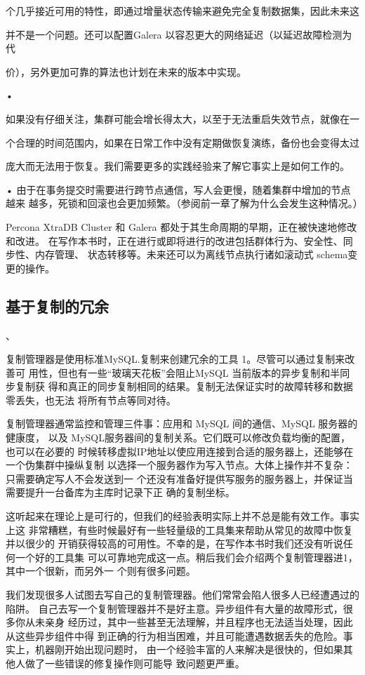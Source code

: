 个几乎接近可用的特性，即通过增量状态传输来避免完全复制数据集，因此未来这

并不是一个问题。还可以配置Galera 以容忍更大的网络延迟（以延迟故障检测为代

价），另外更加可靠的算法也计划在未来的版本中实现。

•

如果没有仔细关注，集群可能会增长得太大，以至于无法重启失效节点，就像在一

个合理的时间范围内，如果在日常工作中没有定期做恢复演练，备份也会变得太过

庞大而无法用于恢复。我们需要更多的实践经验来了解它事实上是如何工作的。

• 由于在事务提交时需要进行跨节点通信，写人会更慢，随着集群中增加的节点越来
越多，死锁和回滚也会更加频繁。（参阅前一章了解为什么会发生这种情况。）

Percona XtraDB Cluster 和 Galera 都处于其生命周期的早期，正在被快速地修改和改进。
在写作本书时，正在进行或即将进行的改进包括群体行为、安全性、同步性、内存管理、
状态转移等。未来还可以为离线节点执行诸如滚动式 schema变更的操作。

\subsection{基于复制的冗余}
、

复制管理器是使用标准MySQL.复制来创建冗余的工具 1。尽管可以通过复制来改善可
用性，但也有一些“玻璃天花板”会阻止MySQL 当前版本的异步复制和半同步复制获
得和真正的同步复制相同的结果。复制无法保证实时的故障转移和数据零丢失，也无法
将所有节点等同对待。

复制管理器通常监控和管理三件事：应用和 MySQL 间的通信、MySQL 服务器的健康度，
以及 MySQL服务器间的复制关系。它们既可以修改负载均衡的配置，也可以在必要的
时候转移虚拟IP地址以使应用连接到合适的服务器上，还能够在一个伪集群中操纵复制
以选择一个服务器作为写入节点。大体上操作并不复杂：只需要确定写人不会发送到一
个还没有准备好提供写服务的服务器上，并保证当需要提升一台备库为主库时记录下正
确的复制坐标。

这听起来在理论上是可行的，但我们的经验表明实际上并不总是能有效工作。事实上这
非常糟糕，有些时候最好有一些轻量级的工具集来帮助从常见的故障中恢复并以很少的
开销获得较高的可用性。不幸的是，在写作本书时我们还没有听说任何一个好的工具集
可以可靠地完成这一点。稍后我们会介绍两个复制管理器进1，其中一个很新，而另外一
个则有很多问题。

我们发现很多人试图去写自己的复制管理器。他们常常会陷人很多人已经遭遇过的陷阱。
自己去写一个复制管理器并不是好主意。异步组件有大量的故障形式，很多你从未亲身
经历过，其中一些甚至无法理解，并且程序也无法适当处理，因此从这些异步组件中得
到正确的行为相当困难，并且可能遭遇数据丢失的危险。事实上，机器刚开始出现问题时，
由一个经验丰富的人来解决是很快的，但如果其他人做了一些错误的修复操作则可能导
致问题更严重。

